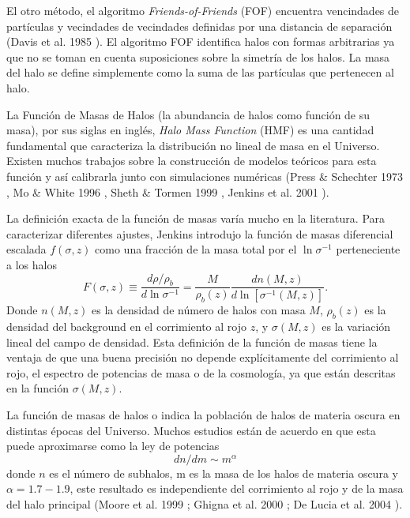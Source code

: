 \documentclass[a4paper,openright,10pt, oneside, final]{book}
\begin{document}
El otro método, el algoritmo \textit{Friends-of-Friends} (FOF) encuentra vencindades de partículas y vecindades de vecindades definidas por una distancia de separación (Davis et al. 1985 \cite{4.4}). El algoritmo FOF identifica halos con formas arbitrarias ya que no se toman en cuenta suposiciones sobre la simetría de los halos. La masa del halo se define simplemente como la suma  de las partículas que pertenecen al halo.
 

La Función de Masas de Halos (la abundancia de halos como función de su masa), por sus siglas en inglés, \textit{Halo Mass Function} (HMF) es una cantidad fundamental que caracteriza la distribución no lineal de masa en el Universo. Existen muchos trabajos sobre la construcción de modelos teóricos para esta función y así calibrarla junto con simulaciones numéricas (Press \& Schechter 1973 \cite{4.4.2}, Mo \& White 1996 \cite{4.4.3}, Sheth \& Tormen 1999 \cite{4.4.4}, Jenkins et al. 2001 \cite{4.4.5}). 

La definición exacta de la función de masas varía mucho en la literatura. Para caracterizar diferentes ajustes, Jenkins introdujo la función de masas diferencial escalada  $f(\sigma, z)$ como una fracción de la masa total por el $\ln \sigma^{-1}$ perteneciente a los halos
\begin{equation}
F(\sigma, z) \equiv \frac{d \rho/\rho_{b}}{d \ln \sigma^{-1}}
=
\frac{M}{\rho_{b}(z)}\frac{d n(M,z)}{d\ln[\sigma^{-1}(M,z)]}.
\end{equation}
Donde $n(M,z)$ es la densidad de número de halos con masa $M$, $\rho_{b}(z)$ es la densidad del background en el corrimiento al rojo $z$, y $\sigma(M,z)$ es la variación lineal del campo de densidad. Esta definición de la función de masas tiene la ventaja de que una buena precisión no depende explícitamente del corrimiento al rojo, el espectro de potencias de masa o de la cosmología, ya que están descritas en la función $\sigma(M,z)$.

La función de masas de halos o  indica la población de halos de materia oscura en distintas épocas del Universo. Muchos estudios están de acuerdo en que esta puede aproximarse como la ley de potencias
\begin{equation}
dn/dm \sim m^{\alpha}\label{eqn 4.11}
\end{equation}
donde $n$ es el número de subhalos, m es la masa de los halos de materia oscura y $\alpha = 1.7 - 1.9$, este resultado es independiente del corrimiento al rojo y de la masa del halo principal (Moore et al. 1999 \cite{4.4.6}; Ghigna et al. 2000 \cite{4.4.7}; De Lucia et al. 2004 \cite{4.4.8}).
\end{document}
